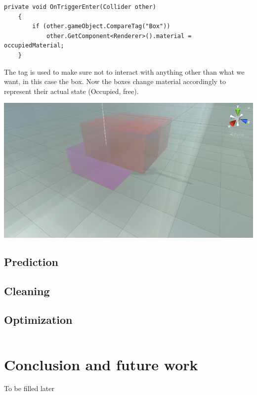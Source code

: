 \documentclass{scrartcl}
\begin{document}
\begin{lstlisting}[language={[Sharp]C}]
  private void OnTriggerEnter(Collider other)
    {
        if (other.gameObject.CompareTag("Box"))
            other.GetComponent<Renderer>().material = occupiedMaterial;
    }

\end{lstlisting}

The tag is used to make sure not to interact with anything other than what we want, in this case the box. 
Now the boxes change material accordingly to represent their actual state (Occupied, free).

\includegraphics{collision}

\subsection{Prediction}
\subsection{Cleaning}
\subsection{Optimization}
\begin{lstlisting}[language={[Sharp]C}]
\end{lstlisting}

\clearpage

\section{Conclusion and future work}
To be filled later


\end{document}
